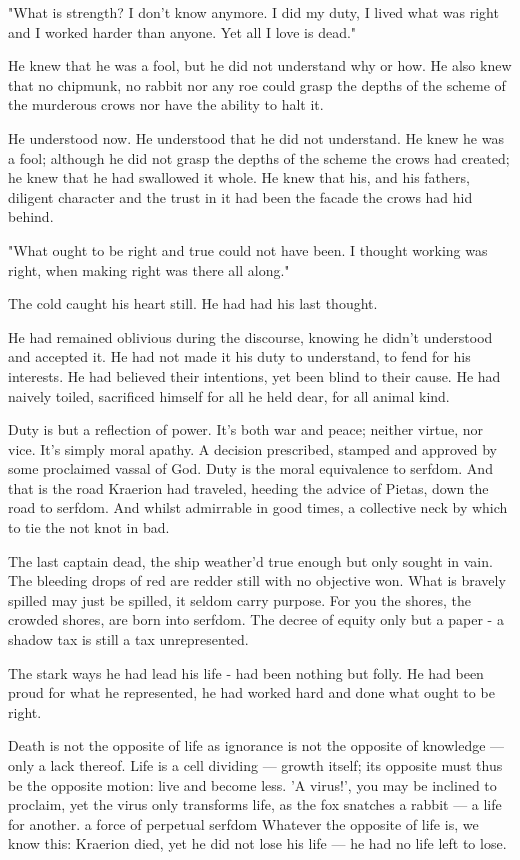 "What is strength? I don't know anymore. I did my duty, I lived what was right and I worked harder than anyone. Yet all I love is dead."

He knew that he was a fool, but he did not understand why or how. He also knew that no chipmunk, no rabbit nor any roe could grasp the depths of the scheme of the murderous crows nor have the ability to halt it.

He understood now. He understood that he did not understand. He knew he was a fool; although he did not grasp the depths of the scheme the crows had created; he knew that he had swallowed it whole. 
He knew that his, and his fathers, diligent character and the trust in it had been the facade the crows had hid behind.

"What ought to be right and true could not have been. I thought working was right, when making right was there all along."

The cold caught his heart still. He had had his last thought. 

He had remained oblivious during the discourse, knowing he didn't understood and accepted it. He had not made it his duty to understand, to fend for his interests. He had believed their intentions, yet been blind to their cause. He had naively toiled, sacrificed himself for all he held dear, for all animal kind. 

Duty is but a reflection of power. It's both war and peace; neither virtue, nor vice. It's simply moral apathy. A decision prescribed, stamped and approved by some proclaimed vassal of God. Duty is the moral equivalence to serfdom. And that is the road Kraerion had traveled, heeding the advice of Pietas, down the road to serfdom. And whilst admirrable in good times, a collective neck by which to tie the not knot in bad. 

The last captain dead, the ship weather'd true enough but only sought in vain. The bleeding drops of red are redder still with no objective won. What is bravely spilled may just be spilled, it seldom carry purpose. For you the shores, the crowded shores, are born into serfdom. The decree of equity only but a paper - a shadow tax is still a tax unrepresented.

The stark ways he had lead his life - had been nothing but folly. He had been proud for what he represented, he had worked hard and done what ought to be right. 


Death is not the opposite of life as ignorance is not the opposite of knowledge — only a lack thereof. Life is a cell dividing — growth itself; its opposite must thus be the opposite motion: live and become less. 'A virus!', you may be inclined to proclaim, yet the virus only transforms life, as the fox snatches a rabbit — a life for another. 
a force of perpetual serfdom
Whatever the opposite of life is, we know this: Kraerion died, yet he did not lose his life — he had no life left to lose.

